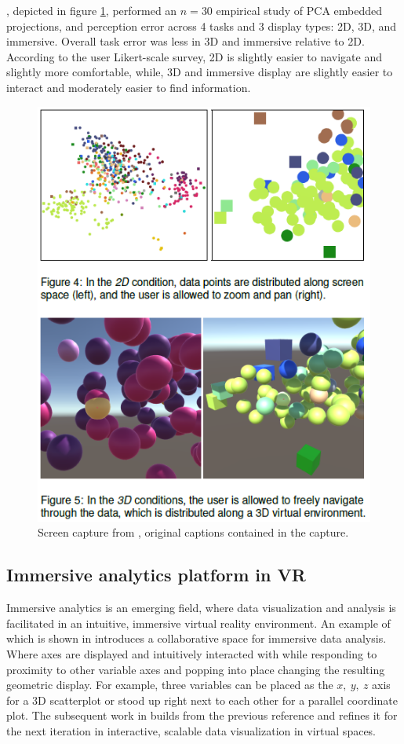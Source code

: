 \documentclass{monashthesis}
\begin{document}
\textcite{wagner_filho_immersive_2018}, depicted in figure
\ref{fig:wagner18fig}, performed an \(n=30\) empirical study of PCA
embedded projections, and perception error across 4 tasks and 3 display
types: 2D, 3D, and immersive. Overall task error was less in 3D and
immersive relative to 2D. According to the user Likert-scale survey, 2D
is slightly easier to navigate and slightly more comfortable, while, 3D
and immersive display are slightly easier to interact and moderately
easier to find information.





\begin{figure}

{\centering \includegraphics[width=0.5\linewidth]{./figures/wagner18fig} 

}

\caption{Screen capture from
\textcite{wagner_filho_immersive_2018}, original captions contained in
the capture.}\label{fig:wagner18fig}
\end{figure}

\subsection{Immersive analytics platform in
VR}\label{immersive-analytics-platform-in-vr}

Immersive analytics is an emerging field, where data visualization and
analysis is facilitated in an intuitive, immersive virtual reality
environment. An example of which is shown in
\textcite{cordeil_imaxes:_2017} introduces a collaborative space for
immersive data analysis. Where axes are displayed and intuitively
interacted with while responding to proximity to other variable axes and
popping into place changing the resulting geometric display. For
example, three variables can be placed as the \(x,~y,~z\) axis for a 3D
scatterplot or stood up right next to each other for a parallel
coordinate plot. The subsequent work in
\textcite{cordeil_immersive_2019} builds from the previous reference and
refines it for the next iteration in interactive, scalable data
visualization in virtual spaces.
\end{document}
